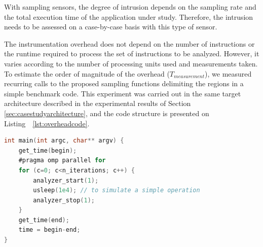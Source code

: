 With sampling sensors, the degree of intrusion depends on the sampling rate and the total execution time of the application under study. Therefore, the intrusion needs to be assessed on a case-by-case basis with this type of sensor.




The instrumentation overhead does not depend on the number of instructions or the runtime required to process the set of instructions to be analyzed. However, it varies according to the number of processing units used and measurements taken. To estimate the order of magnitude of the overhead ($T_{measurement}$), %
we measured recurring calls to the proposed sampling functions delimiting the regions in a simple benchmark code. This experiment was carried out in the same target architecture described in the experimental results of Section \ref{sec:casestudyarchitecture}, and the code structure is presented on Listing~~\ref{lst:overheadcode}.

\lstset{style=ccodestyle, frame=tb}

\begin{lstlisting}[label={lst:overheadcode}, language=C, caption={Code used to measure the overhead of instrumentation functions ({\tt analyzer\_start} and {\tt analyzer\_stop}) defined as $T_{measurement}$.}]
int main(int argc, char** argv) {
	get_time(begin);
	#pragma omp parallel for
	for (c=0; c<n_iterations; c++) {
		analyzer_start(1);
		usleep(1e4); // to simulate a simple operation
		analyzer_stop(1);
	} 
	get_time(end);
	time = begin-end;
}
\end{lstlisting}



